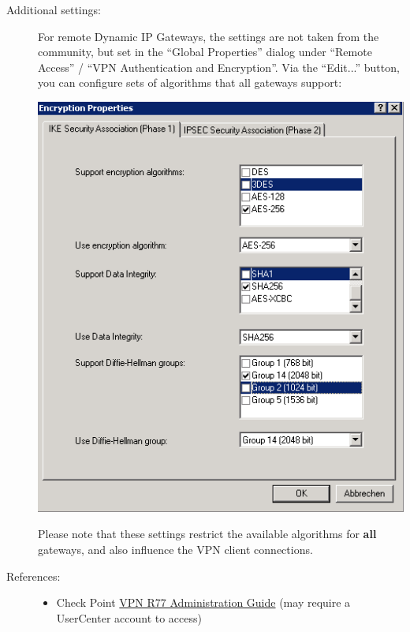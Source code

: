 \begin{description}
\item[Additional settings:]

For remote Dynamic IP Gateways, the settings are not taken from the
community, but set in the ``Global Properties'' dialog under ``Remote
Access'' / ``VPN Authentication and Encryption''. Via the ``Edit...''
button, you can configure sets of algorithms that all gateways support:

\includegraphics{checkpoint_4.png}

Please note that these settings restrict the available algorithms for
\textbf{all} gateways, and also influence the VPN client connections.



\item[References:]\mbox{}

\begin{itemize}

\item Check Point
  \href{https://sc1.checkpoint.com/documents/R77/CP_R77_VPN_AdminGuide/html_frameset.htm}{VPN
    R77 Administration Guide} (may require a
  UserCenter account to access)

\end{itemize}


\end{description}



